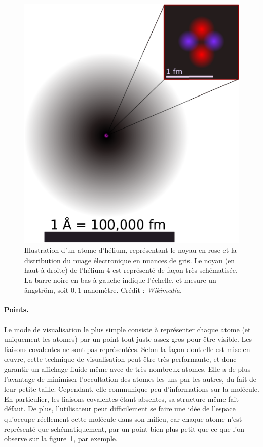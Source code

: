 	\begin{figure}[H]
		\centering
		\includegraphics[width=\textwidth]{figures/ch1/helium}
		\caption{Illustration d'un atome d'hélium, représentant le noyau en rose et la distribution du nuage électronique en nuances de gris. Le noyau (en haut à droite) de l'hélium-4 est représenté de façon très schématisée. La barre noire en bas à gauche indique l'échelle, et mesure un \aa{}ngström, soit $0,1$ nanomètre. Crédit : \emph{Wikimedia}.}
		\label{fig:helium}
	\end{figure}
	
	\paragraph{Points.} Le mode de visualisation le plus simple consiste à représenter chaque atome (et uniquement les atomes) par un point tout juste assez gros pour être visible. Les liaisons covalentes ne sont pas représentées. Selon la façon dont elle est mise en œuvre, cette technique de visualisation peut être très performante, et donc garantir un affichage fluide même avec de très nombreux atomes. Elle a de plus l'avantage de minimiser l'occultation des atomes les uns par les autres, du fait de leur petite taille. Cependant, elle communique peu d'informations sur la molécule. En particulier, les liaisons covalentes étant absentes, sa structure même fait défaut. De plus, l'utilisateur peut difficilement se faire une idée de l'espace qu'occupe réellement cette molécule dans son milieu, car chaque atome n'est représenté que schématiquement, par un point bien plus petit que ce que l'on observe sur la figure~\ref{fig:helium}, par exemple.
		
